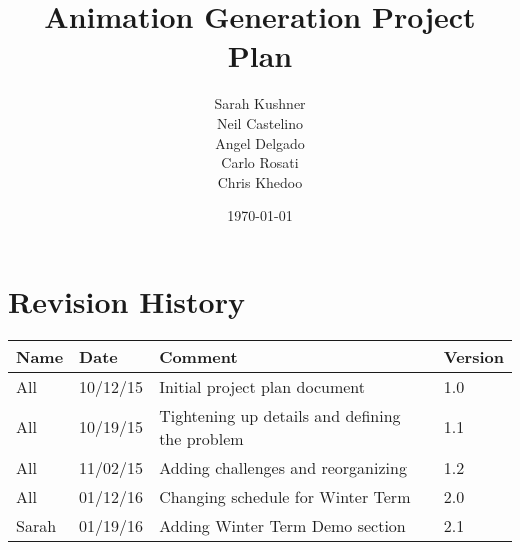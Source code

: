 \documentclass{article}
\begin{document}
\title{Animation Generation Project Plan}
\author{Sarah Kushner \\
		Neil Castelino \\
		Angel Delgado \\
		Carlo Rosati \\
		Chris Khedoo}
\date{\today}
\maketitle

\pagebreak
\tableofcontents
\pagebreak

\section{Revision History}
\begin{table}[hp]
\centering
\begin{tabular}{|l|l|l|l|}
\hline
Name 		& Date	 		& 	Comment	 								& 	Version	 \\ \hline
All		& 10/12/15		& 	Initial project plan document			&  	1.0 		 \\ \hline
All		& 10/19/15		& 	Tightening up details and defining the problem			&  	1.1 		 \\ \hline
All		& 11/02/15		& 	Adding challenges and reorganizing			&  	1.2 		 \\ \hline
All		& 01/12/16		& 	Changing schedule for Winter Term			&  	2.0 		 \\ \hline
Sarah		& 01/19/16		& 	Adding Winter Term Demo section			&  	2.1 		 \\ \hline
\end{tabular}
\end{table}

\pagebreak

















\end{document}
